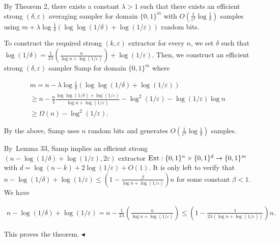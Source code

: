 \documentclass[10pt,a4paper]{article}
\begin{document}
By Theorem 2, there exists a constant $\lambda>1$ such that there exists an efficient strong $(\delta,\varepsilon)$ averaging sampler for domain $\{0,1\}^{m}$ with $O(\frac{1}{\varepsilon^{2}}\log\frac{1}{\delta})$ samples using $m+\lambda\log\frac{1}{\delta}(\log\log(1/\delta)+\log(1/\varepsilon))$ random bits.\par




To construct the required strong $(k,\varepsilon)$ extractor for every $n$, we set $\delta$ such that $\log(1/\delta)=\frac{1}{2\lambda}(\frac{n}{\log n+\log(1/\varepsilon)})+\log(1/\varepsilon)$.
Then, we construct an efficient strong $(\delta,\varepsilon)$ sampler Samp for domain $\{0,1\}^{m}$ where\par


\[\begin{gathered}
\displaystyle m \displaystyle=n-\lambda\log\frac{1}{\delta}(\log\log(1/\delta)+\log(1/\varepsilon)) \\
\displaystyle\geq n-\frac{n}{2}\frac{\log\log(1/\delta)+\log(1/\varepsilon)}{\log n+\log(1/\varepsilon)}-\log^{2}(1/\varepsilon)-\log(1/\varepsilon)\log n \\
\displaystyle\geq\Omega(n)-\log^{2}(1/\varepsilon).
\end{gathered}\]




By the above, Samp uses $n$ random bits and generates $O(\frac{1}{\varepsilon^{2}}\log\frac{1}{\delta})$ samples.\par




By Lemma 33, Samp implies an efficient strong $(n-\log(1/\delta)+\log(1/\varepsilon),2\varepsilon)$ extractor $\textup{{Ext}}:\{0,1\}^{n}\times\{0,1\}^{d}\to\{0,1\}^{m}$ with $d=\log(n-k)+2\log(1/\varepsilon)+O(1)$.
It is only left to verify that $n-\log(1/\delta)+\log(1/\varepsilon)\leq(1-\frac{\beta}{\log n+\log(1/\varepsilon)})n$ for some constant $\beta<1$.
We have\par


\[\begin{gathered}
n-\log(1/\delta)+\log(1/\varepsilon)=n-\frac{1}{2\lambda}(\frac{n}{\log n+\log(1/\varepsilon)})\leq(1-\frac{1}{2\lambda(\log n+\log(1/\varepsilon))})n.
\end{gathered}\]


This proves the theorem.
$\blacktriangleleft$\par
\end{document}
